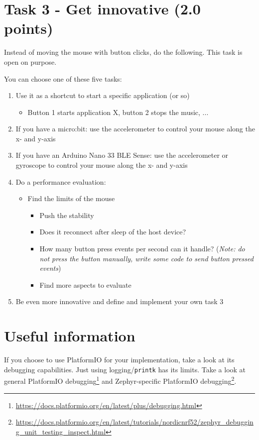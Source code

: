 \documentclass[11pt]{article}
\begin{document}
\section*{Task 3 - Get innovative (2.0 points)}

Instead of moving the mouse with button clicks, do the following. This task is open on purpose.

You can choose one of these five tasks:

\begin{enumerate}
    \item Use it as a shortcut to start a specific application (or so)
    \begin{itemize}
        \item Button 1 starts application X, button 2 stops the music, ...
    \end{itemize}
    \item If you have a micro:bit: use the accelerometer to control your mouse along the x- and y-axis
    \item If you have an Arduino Nano 33 BLE Sense: use the accelerometer or gyroscope to control your mouse along the x- and y-axis
    \clearpage
    \item Do a performance evaluation:
    \begin{itemize}
        \item Find the limits of the mouse
        \begin{itemize}
            \item Push the stability
            \item Does it reconnect after sleep of the host device?
            \item How many button press events per second can it handle? (\textit{Note: do not press the button manually, write some code to send button pressed events})
            \item Find more aspects to evaluate
        \end{itemize}
    \end{itemize}
    \item Be even more innovative and define and implement your own task 3
\end{enumerate}

\section*{Useful information}

If you choose to use PlatformIO for your implementation, take a look at its debugging capabilities. Just using logging/\texttt{printk} has its limits. Take a look at general PlatformIO debugging\footnote{\url{https://docs.platformio.org/en/latest/plus/debugging.html}} and Zephyr-specific PlatformIO debugging\footnote{\url{https://docs.platformio.org/en/latest/tutorials/nordicnrf52/zephyr\_debugging\_unit\_testing\_inspect.html}}.
\end{document}
